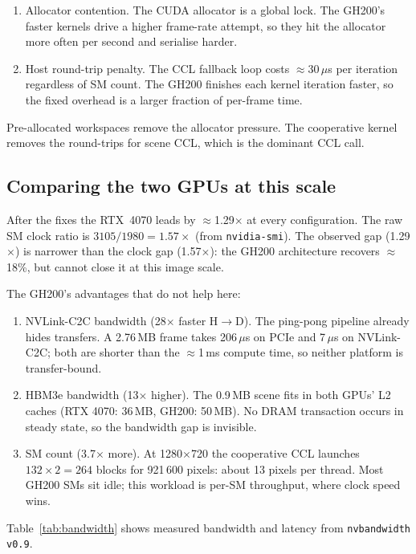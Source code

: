 \begin{enumerate}
  \item Allocator contention. The CUDA allocator is a global lock. The GH200's faster kernels drive a higher frame-rate attempt, so they hit the allocator more often per second and serialise harder.
  \item Host round-trip penalty. The CCL fallback loop costs $\approx$30\,$\mu$s per iteration regardless of SM count. The GH200 finishes each kernel iteration faster, so the fixed overhead is a larger fraction of per-frame time.
\end{enumerate}

Pre-allocated workspaces remove the allocator pressure.
The cooperative kernel removes the round-trips for scene CCL, which is the dominant CCL call.

\subsection{Comparing the two GPUs at this scale}

After the fixes the RTX~4070 leads by $\approx$1.29$\times$ at every configuration.
The raw SM clock ratio is $3105 / 1980 = 1.57\times$ (from \texttt{nvidia-smi}).
The observed gap (1.29$\times$) is narrower than the clock gap (1.57$\times$): the GH200 architecture recovers $\approx$18\%, but cannot close it at this image scale.

The GH200's advantages that do not help here:

\begin{enumerate}
  \item NVLink-C2C bandwidth (28$\times$ faster H$\to$D). The ping-pong pipeline already hides transfers. A 2.76\,MB frame takes 206\,$\mu$s on PCIe and 7\,$\mu$s on NVLink-C2C; both are shorter than the $\approx$1\,ms compute time, so neither platform is transfer-bound.
  \item HBM3e bandwidth (13$\times$ higher). The 0.9\,MB scene fits in both GPUs' L2 caches (RTX 4070: 36\,MB, GH200: 50\,MB). No DRAM transaction occurs in steady state, so the bandwidth gap is invisible.
  \item SM count (3.7$\times$ more). At 1280$\times$720 the cooperative CCL launches $132 \times 2 = 264$ blocks for 921\,600 pixels: about 13 pixels per thread. Most GH200 SMs sit idle; this workload is per-SM throughput, where clock speed wins.
\end{enumerate}

Table~\ref{tab:bandwidth} shows measured bandwidth and latency from \texttt{nvbandwidth v0.9}.

